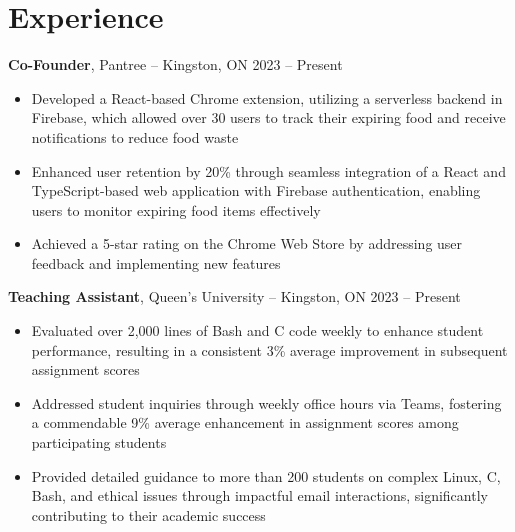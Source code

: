 

\section*{Experience}
\textbf{Co-Founder}, {Pantree} -- Kingston, ON \hfill 2023 -- Present \\
\vspace{-9pt}
\begin{itemize}
  \item Developed a React-based Chrome extension, utilizing a serverless backend in Firebase, which allowed over 30 users to track their expiring food and receive notifications to reduce food waste
  \item Enhanced user retention by 20\% through seamless integration of a React and TypeScript-based web application with Firebase authentication, enabling users to monitor expiring food items effectively
  \item Achieved a 5-star rating on the Chrome Web Store by addressing user feedback and implementing new features
\end{itemize}
\textbf{Teaching Assistant}, {Queen's University} -- Kingston, ON \hfill 2023 -- Present \\
\vspace{-9pt}
\begin{itemize}
  \item Evaluated over 2,000 lines of Bash and C code weekly to enhance student performance, resulting in a consistent 3\% average improvement in subsequent assignment scores
  \item Addressed student inquiries through weekly office hours via Teams, fostering a commendable 9\% average enhancement in assignment scores among participating students
  \item Provided detailed guidance to more than 200 students on complex Linux, C, Bash, and ethical issues through impactful email interactions, significantly contributing to their academic success

\end{itemize}
